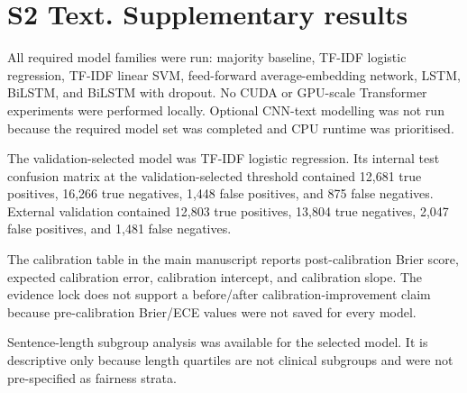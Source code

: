 \section*{S2 Text. Supplementary results}

All required model families were run: majority baseline, TF-IDF logistic regression, TF-IDF linear SVM, feed-forward average-embedding network, LSTM, BiLSTM, and BiLSTM with dropout. No CUDA or GPU-scale Transformer experiments were performed locally. Optional CNN-text modelling was not run because the required model set was completed and CPU runtime was prioritised.

The validation-selected model was TF-IDF logistic regression. Its internal test confusion matrix at the validation-selected threshold contained 12,681 true positives, 16,266 true negatives, 1,448 false positives, and 875 false negatives. External validation contained 12,803 true positives, 13,804 true negatives, 2,047 false positives, and 1,481 false negatives.

The calibration table in the main manuscript reports post-calibration Brier score, expected calibration error, calibration intercept, and calibration slope. The evidence lock does not support a before/after calibration-improvement claim because pre-calibration Brier/ECE values were not saved for every model.

Sentence-length subgroup analysis was available for the selected model. It is descriptive only because length quartiles are not clinical subgroups and were not pre-specified as fairness strata.
